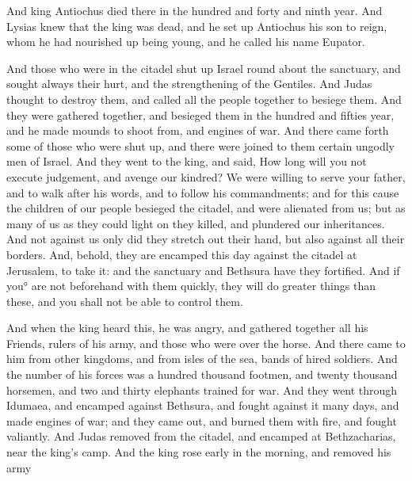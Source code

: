 {And king Antiochus died there in
 the hundred and forty and ninth year.
And Lysias knew that the king was dead, and he set up Antiochus his son to reign, whom he had nourished up being young, and he called his name Eupator.
\par }{\PP {}And those who were in the citadel shut up Israel round about the sanctuary, and sought always their hurt, and the strengthening of the Gentiles.
And Judas thought to destroy them, and called all the people together to besiege them.
And they were gathered together, and besieged them in
 the hundred and fifties year, and he made mounds to shoot from, and engines of war.
And there came forth some of those who were shut up, and there were joined to them certain ungodly men of Israel.
And they went to the king, and said, How long will you not execute judgement, and avenge our kindred?
We were willing to serve your father, and to walk after his words, and to follow his commandments;
and for this cause the children of our people besieged
 the citadel, and were alienated from us; but as many of us as they could light on they killed, and plundered our inheritances.
And not against us only did they stretch out their hand, but also against all their borders.
And, behold, they are encamped this day against the citadel at Jerusalem, to take it: and the sanctuary and Bethsura have they fortified.
And if you° are not beforehand with them quickly, they will do greater things than these, and you shall not be able to control them.
\par }{\PP {}And when the king heard this, he was angry, and gathered together all his
 Friends,
{} rulers of his army, and those who were over the horse.
And there came to him from other kingdoms, and from isles of the sea, bands of hired soldiers.
And the number of his forces was a hundred thousand footmen, and twenty thousand horsemen, and two and thirty elephants trained for war.
And they went through Idumaea, and encamped against Bethsura, and fought against it many days, and made engines of war; and they
{} came out, and burned them with fire, and fought valiantly.
And Judas removed from the citadel, and encamped at Bethzacharias, near the king’s camp.
And the king rose early in the morning, and removed his army
}

